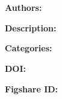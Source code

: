\documentclass[english]{article}
\begin{document}

\section*{\FigshareMetaGetTitle}

\textbf{Authors:} \FigshareMetaGetAuthorsFullName%

\FigshareMetaBeginHtmlBreaks%
\textbf{Description:} \FigshareMetaGetDescription%
\FigshareMetaEndHtmlBreaks%
\par

\textbf{Categories:} \FigshareMetaGetCategories%

\textbf{DOI:} \FigshareMetaGetDOI*%

\textbf{Figshare ID:} \FigshareMetaGetID%

\FigshareMetaTabulateFiles%
\end{document}
